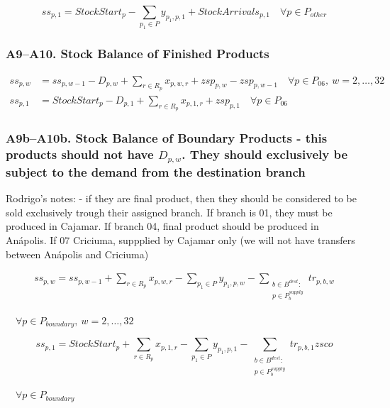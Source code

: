 \documentclass{article}
\begin{document}
\begin{equation}
ss_{p,1} = StockStart_p - \sum_{p_1 \in P} y_{p_1,p,1} 
+ StockArrivals_{p,1}
\quad \forall p \in P_{other}
\label{eq:A8}
\end{equation}


\subsubsection*{A9--A10. Stock Balance of Finished Products}

\begin{align}
ss_{p,w} &= ss_{p,w-1} - D_{p,w} + \sum_{r \in R_p} x_{p,w,r}
+ zsp_{p,w} - zsp_{p,w-1}
\quad \forall p \in P_{06},\ w = 2,\ldots,32 \label{eq:A9}\\
ss_{p,1} &= StockStart_p - D_{p,1} + \sum_{r \in R_p} x_{p,1,r}
+ zsp_{p,1}
\quad \forall p \in P_{06} \label{eq:A10}
\end{align}

\subsubsection*{A9b--A10b. Stock Balance of Boundary Products - this products should not have $D_{p,w}$. They should exclusively be subject to the demand from the destination branch} 

Rodrigo's notes: 
- if they are final product, then they should be considered to be sold exclusively trough their assigned branch. If branch is 01, they must be produced in Cajamar. If branch 04, final product should be produced in Anápolis. If 07 Criciuma, suppplied by Cajamar only (we will not have transfers between Anápolis and Criciuma)

\begin{equation} 
\begin{gathered} 
ss_{p,w} = ss_{p,w-1} + \sum_{r \in R_p} x_{p,w,r} - \sum_{p_1 \in P} y_{p_1,p,w} - \sum_{\substack{b \in B^{dest}:
\\ p \in P^{supply}_b}} tr_{p,b,w} \end{gathered} 
\label{eq:A9b} 
\end{equation} 

\begin{center} 
$\quad \forall p \in P_{boundary},\ w = 2,\ldots,32$ 
\end{center} 

\begin{equation} 
ss_{p,1} = StockStart_p + \sum_{r \in R_p} x_{p,1,r} - \sum_{p_1 \in P} y_{p_1,p,1} - \sum_{\substack{b \in B^{dest}:\\ p \in P^{supply}_b}} tr_{p,b,1}
\label{eq:A10b} zsco
\end{equation} 
\begin{center} 
$\quad \forall p \in P_{boundary}$ 
\end{center}
\end{document}

